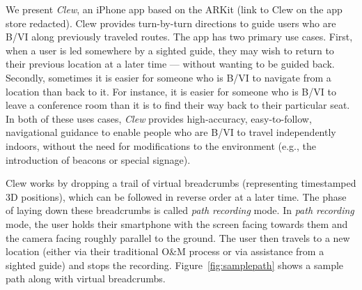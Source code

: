 \documentclass[chi_draft]{sigchi}
\newcommand{\BVI}{B/VI\xspace}
\newcommand{\OM}{O\&M\xspace}
\begin{document}
We present \emph{Clew}, an iPhone app based on the ARKit (link to Clew on the app store redacted).  Clew provides turn-by-turn directions to guide users who are \BVI along previously traveled routes.  The app has two primary use cases.  First, when a user is led somewhere by a sighted guide, they may wish to return to their previous location at a later time --- without wanting to be guided back.  Secondly, sometimes it is easier for someone who is \BVI to navigate from a location than back to it.  For instance, it is easier for someone who is \BVI to leave a conference room than it is to find their way back to their particular seat.  In both of these uses cases, \emph{Clew} provides high-accuracy, easy-to-follow, navigational guidance to enable people who are \BVI to travel independently indoors, without the need for modifications to the environment (e.g., the introduction of beacons or special signage).  

Clew works by dropping a trail of virtual breadcrumbs (representing timestamped 3D positions), which can be followed in reverse order at a later time.  The phase of laying down these breadcrumbs is called \emph{path recording} mode.  In \emph{path recording} mode, the user holds their smartphone with the screen facing towards them and the camera facing roughly parallel to the ground.  The user then travels to a new location (either via their traditional \OM process or via assistance from a sighted guide) and stops the recording.  Figure~\ref{fig:samplepath} shows a sample path along with virtual breadcrumbs.%
%
\end{document}

